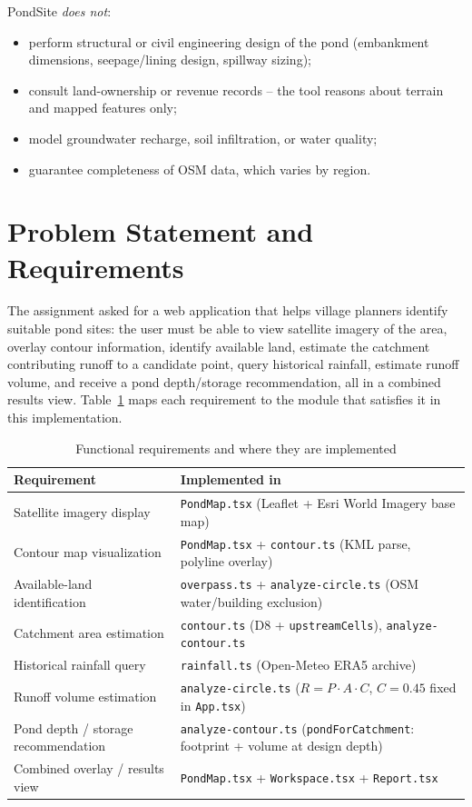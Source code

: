 \documentclass[manuscript,screen,review]{acmart}
\begin{document}
PondSite \emph{does not}:

\begin{itemize}
  \item perform structural or civil engineering design of the pond
  (embankment dimensions, seepage/lining design, spillway sizing);
  \item consult land-ownership or revenue records -- the tool reasons about
  terrain and mapped features only;
  \item model groundwater recharge, soil infiltration, or water quality;
  \item guarantee completeness of OSM data, which varies by region.
\end{itemize}

\section{Problem Statement and Requirements}
\label{sec:requirements}
The assignment asked for a web application that helps village planners
identify suitable pond sites: the user must be able to view satellite imagery
of the area, overlay contour information, identify available land, estimate
the catchment contributing runoff to a candidate point, query historical
rainfall, estimate runoff volume, and receive a pond depth/storage
recommendation, all in a combined results view. Table~\ref{tab:requirements}
maps each requirement to the module that satisfies it in this implementation.

\begin{table}[h]
  \caption{Functional requirements and where they are implemented}
  \label{tab:requirements}
  \begin{tabular}{p{3.6cm}p{3.6cm}}
    \toprule
    Requirement & Implemented in \\
    \midrule
    Satellite imagery display & \small\texttt{PondMap.tsx} (Leaflet + Esri World Imagery base map) \\
    Contour map visualization & \small\texttt{PondMap.tsx} + \texttt{contour.ts} (KML parse, polyline overlay) \\
    Available-land identification & \small\texttt{overpass.ts} + \texttt{analyze-circle.ts} (OSM water/building exclusion) \\
    Catchment area estimation & \small\texttt{contour.ts} (D8 + \texttt{upstreamCells}), \texttt{analyze-contour.ts} \\
    Historical rainfall query & \small\texttt{rainfall.ts} (Open-Meteo ERA5 archive) \\
    Runoff volume estimation & \small\texttt{analyze-circle.ts} ($R = P \cdot A \cdot C$, $C{=}0.45$ fixed in \texttt{App.tsx}) \\
    Pond depth / storage recommendation & \small\texttt{analyze-contour.ts} (\texttt{pondForCatchment}: footprint + volume at design depth) \\
    Combined overlay / results view & \small\texttt{PondMap.tsx} + \texttt{Workspace.tsx} + \texttt{Report.tsx} \\
    \bottomrule
  \end{tabular}
\end{table}
\end{document}

